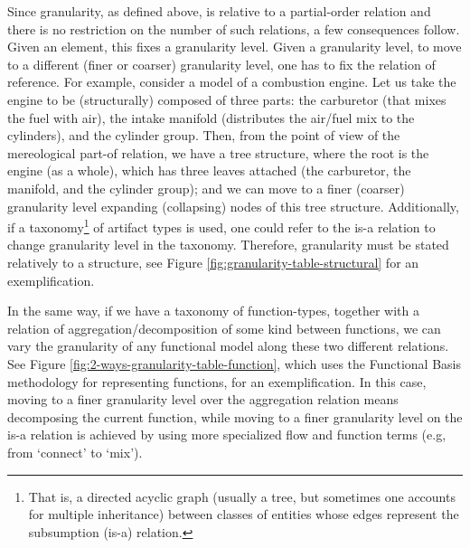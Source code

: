 \documentclass[
]{ceurart}
\begin{document}
\eflist
Since granularity, as defined above, is relative to a partial-order relation and there is no restriction on the number of such relations, a few consequences follow. Given an element, this fixes a granularity level. Given a granularity level, to move to a different (finer or coarser) granularity level, one has to fix the relation of reference. For example, consider a model of a combustion engine. Let us take the engine to be (structurally) composed of three parts: the carburetor (that mixes the fuel with air), the intake manifold (distributes the air/fuel mix to the cylinders), and the cylinder group. Then, from the point of view of the mereological part-of relation, we have a tree structure, where the root is the engine (as a whole), which has three leaves attached (the carburetor, the manifold, and the cylinder group); and we can move to a finer (coarser) granularity level expanding (collapsing) nodes of this tree structure. Additionally, if a taxonomy\footnote{That is, a directed acyclic graph (usually a tree, but sometimes one accounts for multiple inheritance) between classes of entities whose edges represent the subsumption (is-a) relation.} of artifact types is used, one could refer to the is-a relation to change granularity level in the taxonomy. Therefore, granularity must be stated relatively to a structure, see Figure \ref{fig:granularity-table-structural} for an exemplification. 

In the same way, if we have a taxonomy of function-types, together with a relation of aggregation/decomposition of some kind between functions, we can vary the granularity of any functional model along these two different relations. See Figure \ref{fig:2-ways-granularity-table-function}, which uses the Functional Basis methodology for representing functions, for an exemplification. In this case, moving to a finer granularity level over the aggregation relation means decomposing the current function, while moving to a finer granularity level on the is-a relation is achieved by using more specialized flow and function terms (e.g, from `connect' to `mix').
\end{document}
